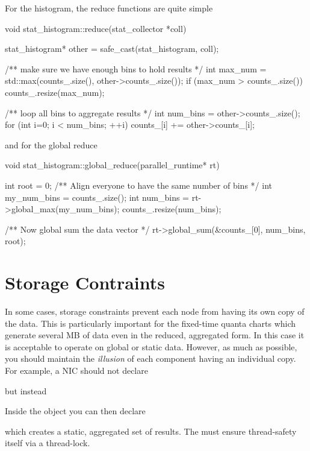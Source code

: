 For the histogram, the reduce functions are quite simple

\begin{CppCode}
void
stat_histogram::reduce(stat_collector *coll)
{
  stat_histogram* other = safe_cast(stat_histogram, coll);

  /** make sure we have enough bins to hold results */
  int max_num = std::max(counts_.size(), other->counts_.size());
  if (max_num > counts_.size()){
    counts_.resize(max_num);
  }

  /** loop all bins to aggregate results */
  int num_bins = other->counts_.size();
  for (int i=0; i < num_bins; ++i){
    counts_[i] += other->counts_[i];
  }
}
\end{CppCode}

and for the global reduce
\begin{CppCode}
void
stat_histogram::global_reduce(parallel_runtime* rt)
{
  int root = 0;
  /** Align everyone to have the same number of bins */
  int my_num_bins = counts_.size();
  int num_bins = rt->global_max(my_num_bins);
  counts_.resize(num_bins);
  
  /** Now global sum the data vector */
  rt->global_sum(&counts_[0], num_bins, root);
}
\end{CppCode}

\section{Storage Contraints}\label{sec:storageStats}
In some cases, storage constraints prevent each node from having its own copy of the data.
This is particularly important for the fixed-time quanta charts which generate several MB of data even in the reduced, aggregated form.
In this case it is acceptable to operate on global or static data.
However, as much as possible, you should maintain the \emph{illusion} of each component having an individual copy.
For example, a NIC should not declare

\begin{CppCode}
class nic {
 ...
 static ftq_calendar* ftq_;
\end{CppCode}
but instead
\begin{CppCode}
class nic {
 ...
 ftq_calendar* ftq_;
\end{CppCode}

Inside the  object you can then declare
\begin{CppCode}
class ftq_calendar {
 ...
 static thread_lock lock_;
 static std::vector<ftq_epoch> results_;
\end{CppCode}
which creates a static, aggregated set of results.
The  must ensure thread-safety itself via a thread-lock.

